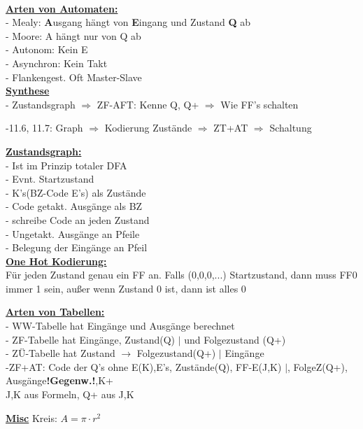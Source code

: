 \documentclass[8pt]{extarticle}
\begin{document}
~~~~~~~
\begin{minipage}{0.33\textwidth}

\underline{\textbf{Arten von Automaten:}}\\
- Mealy: \textbf{A}usgang hängt von \textbf{E}ingang und Zustand \textbf{Q} ab \\
- Moore: A hängt nur von Q ab \\
- Autonom: Kein E \\
- Asynchron: Kein Takt \\
- Flankengest. Oft Master-Slave \\

\underline{\textbf{Synthese}}\\
- Zustandsgraph $\Rightarrow$ ZF-AFT: Kenne Q, Q+ $\Rightarrow$ Wie FF's schalten

-11.6, 11.7: Graph $\Rightarrow$ Kodierung Zustände $\Rightarrow$ ZT+AT $\Rightarrow$ Schaltung
\vspace{5cm}

\underline{\textbf{Zustandsgraph:}}\\
- Ist im Prinzip totaler DFA\\
- Evnt. Startzustand\\
- K's(BZ-Code E's) als Zustände\\
- Code getakt. Ausgänge als BZ\\
- schreibe Code an jeden Zustand\\
- Ungetakt. Ausgänge an Pfeile\\
- Belegung der Eingänge an Pfeil\\

\underline{\textbf{One Hot Kodierung:}}\\
Für jeden Zustand genau ein FF an. Falls (0,0,0,...) Startzustand, dann muss FF0 immer 1 sein, außer wenn Zustand 0 ist, dann ist alles 0
\end{minipage}%

\vspace*{-0.3 cm}
\underline{\textbf{Arten von Tabellen:}}\\
- WW-Tabelle hat Eingänge und Ausgänge berechnet\\
- ZF-Tabelle hat Eingänge, Zustand(Q) $|$ und Folgezustand (Q+)\\
- ZÜ-Tabelle hat Zustand $\rightarrow$ Folgezustand(Q+) $|$ Eingänge\\
-ZF+AT: Code der Q's ohne E(K),E's, Zustände(Q), FF-E(J,K) $|$, FolgeZ(Q+), Ausgänge\textbf{!Gegenw.!},K+\\
\phantom{ss} J,K aus Formeln, Q+ aus J,K


\underline{\textbf{Misc}}
Kreis: $A = \pi \cdot r^2$\\
\end{document}
